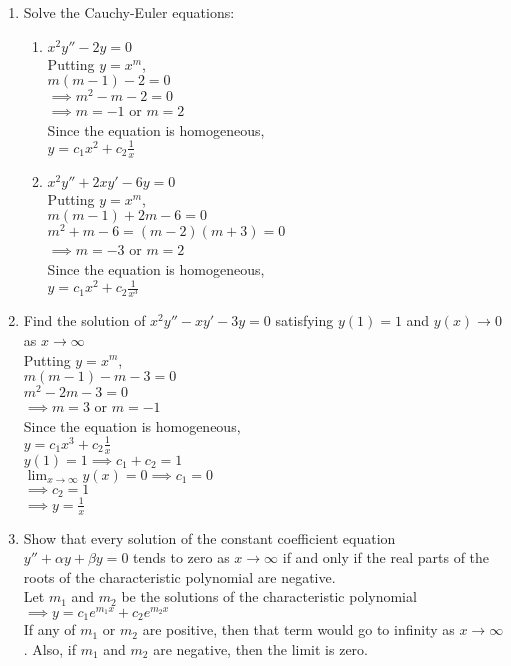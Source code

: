 \documentclass[a4paper]{article}
\begin{document}
\begin{enumerate}
	\item Solve the Cauchy-Euler equations:
	\begin{enumerate}
		\item $x^2y''-2y=0$\\
		Putting $y=x^m$,\\
		$m(m-1)-2=0$\\
		$\implies m^2-m-2=0$\\
		$\implies m=-1$ or $m=2$\\
		Since the equation is homogeneous,\\
		$y=c_1x^2+c_2 \frac{1}{x}$
		
		\item $x^2y''+2xy'-6y=0$\\
		Putting $y=x^m$,\\
		$m(m-1)+2m-6=0$\\
		$m^2+m-6=(m-2)(m+3)=0$\\
		$\implies m=-3$ or $m=2$\\
		Since the equation is homogeneous,\\
		$y=c_1x^2+c_2\frac{1}{x^3}$
		
	\end{enumerate}
	
	\item Find the solution of $x^2y''-xy'-3y=0$ satisfying $y(1)=1$ and $y(x)\to 0$ as $x\to\infty$\\
	Putting $y=x^m$,\\
	$m(m-1)-m-3=0$\\
	$m^2-2m-3=0$\\
	$\implies m=3$ or $m=-1$\\
	Since the equation is homogeneous,\\
	$y=c_1x^3+c_2\frac{1}{x}$\\
	$y(1)=1 \implies c_1+c_2=1$\\
	$\displaystyle{\lim_{x\to\infty}} y(x)=0 \implies c_1=0$\\
	$\implies c_2=1$\\
	$\implies y=\frac{1}{x}$
	
	\item Show that every solution of the constant coefficient equation $y''+\alpha y+\beta y=0$ tends to zero as $x\to \infty$ if and only if the real parts of the roots of the characteristic polynomial are negative.\\
	Let $m_1$ and $m_2$ be the solutions of the characteristic polynomial\\
	$\implies y=c_1e^{m_1x}+c_2e^{m_2x}$\\
	If any of $m_1$ or $m_2$ are positive, then that term would go to infinity as $x\to\infty$. Also, if $m_1$ and $m_2$ are negative, then the limit is zero.
	

\end{enumerate}
\end{document}
